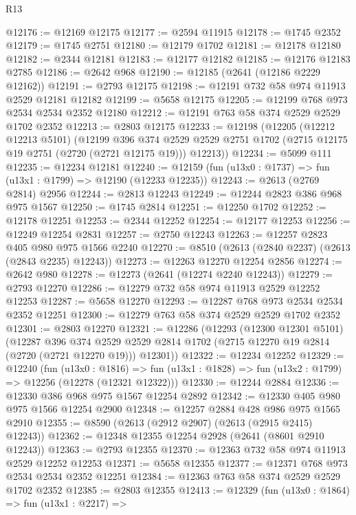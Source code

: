 \begin{lexlean}{R13}
\begin{coremodule}
@12176 := @12169 @12175
@12177 := @2594 @11915
@12178 := @1745 @2352
@12179 := @1745 @2751
@12180 := @12179 @1702
@12181 := @12178 @12180
@12182 := @2344 @12181
@12183 := @12177 @12182
@12185 := @12176 @12183 @2785
@12186 := @2642 @968
@12190 := @12185 (@2641 (@12186 @2229 @12162))
@12191 := @2793 @12175
@12198 := @12191 @732 @58 @974 @11913 @2529 @12181 @12182
@12199 := @5658 @12175
@12205 := @12199 @768 @973 @2534 @2534 @2352 @12180
@12212 := @12191 @763 @58 @374 @2529 @2529 @1702 @2352
@12213 := @2803 @12175
@12233 := @12198
    (@12205
      (@12212 @12213 @5101)
      (@12199
        @396
        @374
        @2529
        @2529
        @2751
        @1702
        (@2715 @12175 @19 @2751 (@2720 (@2721 @12175 @19)))
        @12213))
@12234 := @5099 @111
@12235 := @12234 @12181
@12240 := @12159 (fun (u13x0 : @1737) => fun (u13x1 : @1799) => @12190 (@12233 @12235))
@12243 := @2613 (@2769 @2814) @2956
@12244 := @2813 @12243
@12249 := @12244 @2823 @386 @968 @975 @1567
@12250 := @1745 @2814
@12251 := @12250 @1702
@12252 := @12178 @12251
@12253 := @2344 @12252
@12254 := @12177 @12253
@12256 := @12249 @12254 @2831
@12257 := @2750 @12243
@12263 := @12257 @2823 @405 @980 @975 @1566 @2240
@12270 := @8510 (@2613 (@2840 @2237) (@2613 (@2843 @2235) @12243))
@12273 := @12263 @12270 @12254 @2856
@12274 := @2642 @980
@12278 := @12273 (@2641 (@12274 @2240 @12243))
@12279 := @2793 @12270
@12286 := @12279 @732 @58 @974 @11913 @2529 @12252 @12253
@12287 := @5658 @12270
@12293 := @12287 @768 @973 @2534 @2534 @2352 @12251
@12300 := @12279 @763 @58 @374 @2529 @2529 @1702 @2352
@12301 := @2803 @12270
@12321 := @12286
    (@12293
      (@12300 @12301 @5101)
      (@12287
        @396
        @374
        @2529
        @2529
        @2814
        @1702
        (@2715 @12270 @19 @2814 (@2720 (@2721 @12270 @19)))
        @12301))
@12322 := @12234 @12252
@12329 := @12240
    (fun (u13x0 : @1816) =>
    fun (u13x1 : @1828) => fun (u13x2 : @1799) => @12256 (@12278 (@12321 @12322)))
@12330 := @12244 @2884
@12336 := @12330 @386 @968 @975 @1567 @12254 @2892
@12342 := @12330 @405 @980 @975 @1566 @12254 @2900
@12348 := @12257 @2884 @428 @986 @975 @1565 @2910
@12355 := @8590 (@2613 (@2912 @2907) (@2613 (@2915 @2415) @12243))
@12362 := @12348 @12355 @12254 @2928 (@2641 (@8601 @2910 @12243))
@12363 := @2793 @12355
@12370 := @12363 @732 @58 @974 @11913 @2529 @12252 @12253
@12371 := @5658 @12355
@12377 := @12371 @768 @973 @2534 @2534 @2352 @12251
@12384 := @12363 @763 @58 @374 @2529 @2529 @1702 @2352
@12385 := @2803 @12355
@12413 := @12329
    (fun (u13x0 : @1864) =>
    fun (u13x1 : @2217) =>

\end{coremodule}
\end{lexlean}
